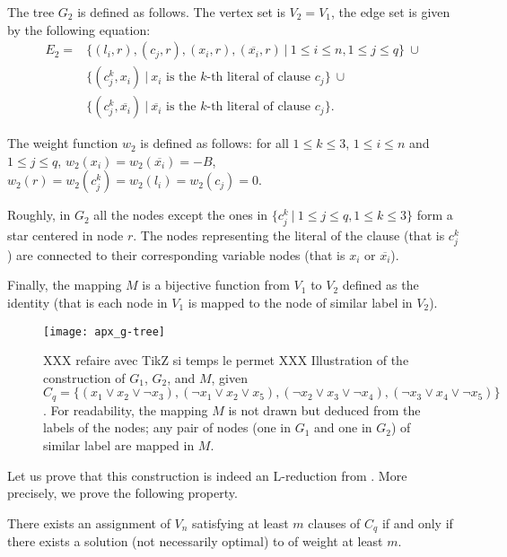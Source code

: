 		The tree $G_2$ is defined as follows. The vertex set is $V_2=V_1$, the edge set is given by the following equation:
		\begin{align*}
		E_2= & \{(l_i,r), (c_j,r), (x_i,r), (\overline{x_i},r) ~\vert~ 1\leq i\leq n, 1\leq j \leq q\} ~\cup \\
		& \{(c^k_j,x_i) ~\vert~ x_i \text{ is the  } k\text{-th literal of clause } c_j\} ~\cup\\
		& \{(c^k_j,\overline{x_i}) ~\vert~ \overline{x_i} \text{ is the } k\text{-th literal of clause } c_j\}.
		\end{align*}

		The weight function $w_2$ is defined as follows: for all $1\leq k \leq 3$, $1\leq i\leq n$ and $1\leq j \leq q$, $w_2(x_i)=w_2(\overline{x_i})=-B$, $w_2(r)=w_2(c_j^k)=w_2(l_i)=w_2(c_j)=0$.


		Roughly, in $G_2$ all the nodes except the ones in $\{c_j^k~\vert~ 1\leq j \leq q, 1\leq k\leq 3\}$ form a star centered in node $r$. The nodes representing the literal of the clause (that is $c_j^k$) are connected to their corresponding variable nodes (that is $x_i$ or $\overline{x_i}$).

		Finally, the mapping $M$ is a bijective function from $V_1$ to $V_2$ defined as the identity (that is each node in $V_1$ is mapped to the node of similar label in $V_2$).


		\begin{figure}[ht]
    	 	 
    	 	 \centering
    	 	 \texttt{[image: apx\_g-tree]}
    	 	 \caption{XXX refaire avec TikZ si temps le permet XXX Illustration of the construction of $G_1$, $G_2$, and $M$, given $C_q = \{(x_1 \vee x_2 \vee \neg{}x_3), (\neg{}x_1 \vee x_2 \vee x_5), (\neg{}x_2 \vee x_3 \vee \neg{}x_4), (\neg{}x_3 \vee x_4 \vee \neg{}x_5)\}$. For readability, the mapping $M$ is not drawn but deduced from the labels of the nodes; any pair of nodes (one in $G_1$ and one in $G_2$) of similar label are mapped in $M$.}\label{fig:g-tree}
    	 	 \end{figure}
   		
		Let us prove that this construction is indeed an L-reduction from \msat{}. More precisely, we prove the following property.

		\begin{lemma}
 	 	 There exists an assignment of $V_n$ satisfying at least $m$ clauses of $C_q$ if and only if there exists a solution (not necessarily optimal) to \mwccs{} of weight at least $m$.
		\end{lemma}

